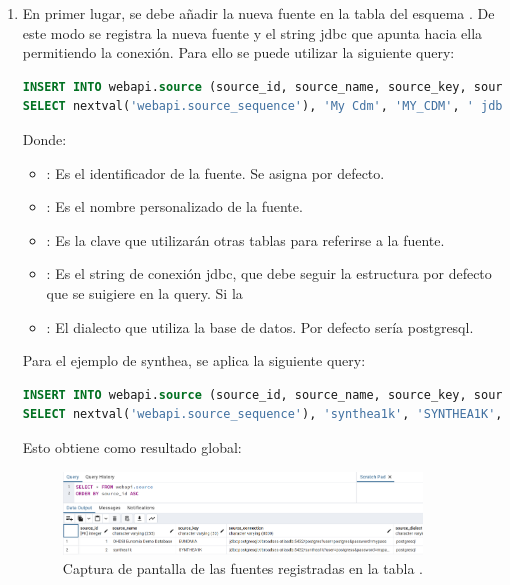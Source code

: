 \begin{enumerate}
    \item En primer lugar, se debe añadir la nueva fuente en la tabla  del esquema . De este modo se registra la nueva fuente y el string jdbc que apunta hacia ella permitiendo la conexión. Para ello se puede utilizar la siguiente query:

\begin{lstlisting}[language=sql]
INSERT INTO webapi.source (source_id, source_name, source_key, source_connection, source_dialect) 
SELECT nextval('webapi.source_sequence'), 'My Cdm', 'MY_CDM', ' jdbc:postgresql://server:5432/cdm?user={user}&password={password}', 'postgresql';
\end{lstlisting}

    Donde:
    \begin{itemize}
        \item {}: Es el identificador de la fuente. Se asigna por defecto.
        \item {}: Es el nombre personalizado de la fuente.
        \item {}: Es la clave que utilizarán otras tablas para referirse a la fuente.
        \item {}: Es el string de conexión jdbc, que debe seguir la estructura por defecto que se suigiere en la query. Si la
        \item {}: El dialecto que utiliza la base de datos. Por defecto sería postgresql.
    \end{itemize}

    Para el ejemplo de synthea, se aplica la siguiente query:

\begin{lstlisting}[language=sql]
INSERT INTO webapi.source (source_id, source_name, source_key, source_connection, source_dialect) 
SELECT nextval('webapi.source_sequence'), 'synthea1k', 'SYNTHEA1K', ' jdbc:postgresql://broadsea-atlasdb:5432/synthea1k?user=postgres&password=mypass', 'postgresql';
\end{lstlisting}

    Esto obtiene como resultado global:

\begin{figure}[H]
    \centering
    \includegraphics[width=0.90\textwidth]{figures/querySource.png}
    \caption{Captura de pantalla de las fuentes registradas en la tabla .}
    \label{fig:querySource}
\end{figure}
    


\end{enumerate}
